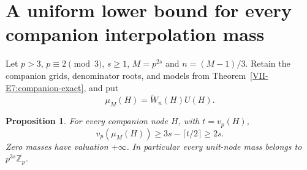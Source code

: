\documentclass[11pt,letterpaper]{article}
\newtheorem{proposition}[theorem]{Proposition}
\numberwithin{equation}{section}
\begin{document}
\section{A uniform lower bound for every companion interpolation mass}\label{loc-VII-8}
\label{VII-sec:E7companionmass}
Let $p>3$, $p\equiv2\pmod3$, $s\ge1$, $M=p^{2s}$ and
$n=(M-1)/3$. Retain the companion grids, denominator roots, and models
from Theorem~\ref{VII-E7:companion-exact}, and put
\[
 \mu_M(H)=\widetilde W_n(H)U(H).
\]
\begin{proposition}\label{VII-E7:companion-mass-bound}
For every companion node $H$, with $t=v_p(H)$,
\[
 \boxed{\quad v_p(\mu_M(H))\ge3s-\lceil t/2\rceil\ge2s.\quad}
\]
Zero masses have valuation $+\infty$. In particular every unit-node
mass belongs to $p^{3s}\mathbb Z_p$.
\end{proposition}
\end{document}
